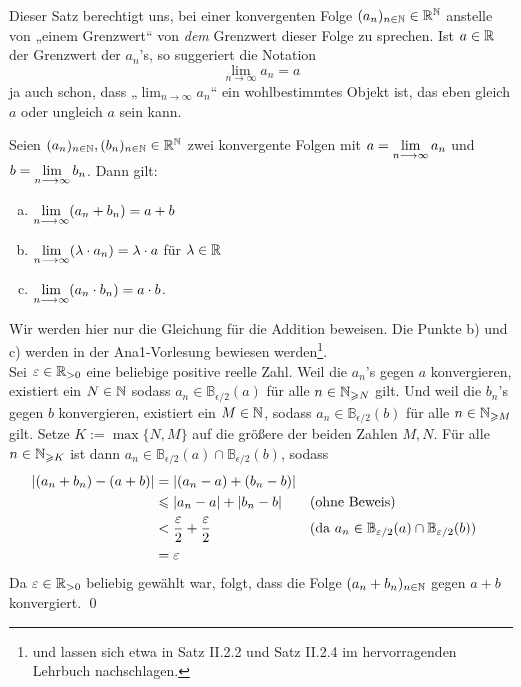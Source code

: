 \begin{bem}
 Dieser Satz berechtigt uns, bei einer konvergenten Folge $(a_n)_{n\in {\mathbb N}}\in {\mathbb R}^{\mathbb N}$ anstelle von „einem Grenzwert“ von \emph{dem} Grenzwert dieser Folge zu sprechen. Ist $a\in {\mathbb R}$ der Grenzwert der $a_n$'s, so suggeriert die Notation
 \[ \lim_{n\to \infty} a_n = a \]
 ja auch schon, dass „$\lim_{n\to \infty}a_n$“ ein wohlbestimmtes Objekt ist, das eben gleich $a$ oder ungleich $a$ sein kann.
\end{bem}



\begin{sat}
	Seien $(a_n)_{n\in {\mathbb N}},(b_n)_{n\in {\mathbb N}}\in {\mathbb R}^{\mathbb N}$ zwei konvergente Folgen mit $a=\lim\limits_{n\longrightarrow\infty}a_n$ und $b=\lim\limits_{n\longrightarrow\infty}b_n$. Dann gilt:
	\begin{enumerate}[a)]
		\item $\lim\limits_{n\longrightarrow\infty}(a_n+b_n)=a+b$
		\item $\lim\limits_{n\longrightarrow\infty}(\lambda \cdot a_n)=\lambda \cdot a$ für $\lambda\in{\mathbb R}$
		\item $\lim\limits_{n\longrightarrow\infty}(a_n\cdot b_n)=a\cdot b$.
	\end{enumerate}
\end{sat}

\begin{bew}
Wir werden hier nur die Gleichung für die Addition beweisen. Die Punkte b) und c) werden in der Ana1-Vorlesung bewiesen werden\footnote{und lassen sich etwa in Satz II.2.2 und Satz II.2.4 im hervorragenden Lehrbuch \citet{AE06} nachschlagen.}. \\[0.5em] 
Sei $\varepsilon \in {\mathbb R}_{>0}$ eine beliebige positive reelle Zahl. Weil die $a_n$'s gegen $a$ konvergieren, existiert ein $N\in{\mathbb N}$ sodass $a_n\in\mathbb{B}_{\epsilon/2}(a)$ für alle $n\in {\mathbb N}_{\geqslant N}$ gilt. Und weil die $b_n$'s gegen $b$ konvergieren, existiert ein $M\in {\mathbb N}$, sodass $a_n\in\mathbb{B}_{\epsilon/2}(b)$ für alle $n\in {\mathbb N}_{\geqslant M}$ gilt. Setze $K:=\max\{N,M\}$ auf die größere der beiden Zahlen $M,N$. Für alle $n\in {\mathbb N}_{\geqslant K}$ ist dann $a_n \in \mathbb{B}_{\epsilon/2}(a)\cap\mathbb{B}_{\epsilon/2}(b)$, sodass
    \begin{align*}
    \left| (a_n+b_n)-(a+b) \right|& = \vert (a_n-a) + (b_n-b)\vert \\
    & \leqslant \left| a_n-a \right|+\left| b_n-b  \right| &&(\text{ohne Beweis})\\
    & <\frac{\varepsilon}{2}+\frac{\varepsilon}{2} &&(\text{da $a_n\in  \mathbb{B}_{\varepsilon/2}(a)\cap\mathbb{B}_{\varepsilon/2}(b)$})\\
    & =\varepsilon
    \end{align*}
Da $\varepsilon\in {\mathbb R}_{>0}$ beliebig gewählt war, folgt, dass die Folge $(a_n+b_n)_{n\in {\mathbb N}}$ gegen $a+b$ konvergiert. \qed
\end{bew}



